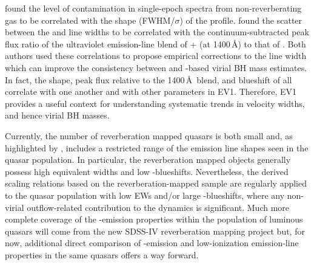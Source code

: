 \citet{denney12} found the level of contamination in single-epoch spectra from non-reverberating gas to be correlated with the shape (FWHM/$\sigma$) of the  profile. 
\citet{runnoe13} found the scatter between the  and \hb line widths to be correlated with the continuum-subtracted peak flux ratio of the ultraviolet emission-line blend of + (at 1400\,\AA) to that of . 
Both authors used these correlations to propose empirical corrections to the  line width which can improve the consistency between  and \hbns-based virial BH mass estimates. 
In fact, the shape, peak flux relative to the 1400\,\AA\, blend, and blueshift of  all correlate with one another and with other parameters in EV1.
Therefore, EV1 provides a useful context for understanding systematic trends in  velocity widths, and hence virial BH masses. 

Currently, the number of reverberation mapped quasars is both small \citep[$\sim$50 quasars;][]{park13} and, as highlighted by \citet{richards11}, includes a restricted range of the  emission line shapes seen in the quasar population. 
In particular, the reverberation mapped objects generally possess high  equivalent widths and low -blueshifts. 
Nevertheless, the derived scaling relations based on the reverberation-mapped sample are regularly applied to the quasar population with low  EWs and/or large -blueshifts, where any non-virial outflow-related contribution to the dynamics is significant. 
Much more complete coverage of the -emission properties within the population of luminous quasars will come from the new SDSS-IV reverberation mapping project \citep{shen15} but, for now, additional direct comparison of -emission and low-ionization emission-line properties in the same quasars offers a way forward.

